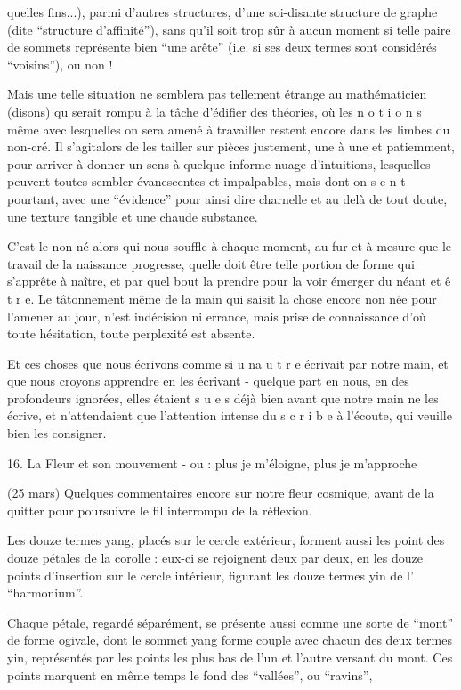 
\margin{\handwritten{\unsure{$\times$|*}}} quelles fins...), parmi d'autres structures, d'une soi-disante structure de graphe (dite ``structure d'affinité''), sans qu'il soit trop sûr à aucun moment si telle paire de sommets représente bien ``une arête'' (i.e. si ses deux termes sont considérés ``voisins''), ou non !

Mais une telle situation ne semblera pas tellement étrange au mathématicien \margin{\handwritten{*}}(disons) qu serait rompu à la tâche d'édifier des théories, où les n o t i o n s même avec lesquelles on sera amené à travailler restent encore dans les limbes du non-cré\leavevmode{}\handwritten{\'{\phantom{e}}}. Il s'agit\unsure{,}alors de les tailler sur pièces justement, une à une et patiemment, pour arriver à donner un sens à quelque informe nuage d'intuitions, lesquelles peuvent toutes sembler évanescentes et impalpables, mais dont on s e n t pourtant, avec une ``évidence'' pour ainsi dire charnelle et au delà de tout doute, une texture tangible et une chaude substance.

C'est le non-né alors qui nous souffle à chaque moment, au fur et à mesure que le travail de la naissance progresse, quelle doit être telle portion de forme qui s'apprête à naître, et par quel bout la prendre pour la voir émerger du néant et ê t r e. Le tâtonnement même de la main qui saisit la chose encore non née pour l'amener au jour, n'est indécision ni errance, mais prise de connaissance d'où toute hésitation, toute perplexité est absente.

Et ces choses que nous écrivons comme si u n\quad a u t r e écrivait par notre main, et que nous croyons apprendre en les écrivant - quelque part en nous, en des profondeurs ignorées, elles étaient s u e s déjà bien avant que notre main ne les écrive, et n'attendaient que l'attention intense du s c r i b e à l'écoute, qui veuille bien les consigner.

16. La Fleur et son mouvement - ou : plus je m'éloigne, plus je m'approche

(25 mars) Quelques commentaires encore sur notre fleur cosmique, avant de la quitter pour poursuivre le fil interrompu de la réflexion.

Les douze termes yang, placés sur le cercle extérieur, forment aussi les point des douze pétales de la corolle : eux-ci se rejoignent deux par deux, en les douze points d'insertion sur le cercle intérieur, figurant les douze termes yin de l' ``harmonium''.

Chaque pétale, regardé séparément, se présente aussi comme une sorte de ``mont'' de forme ogivale, dont le sommet yang forme couple avec chacun des deux termes yin, représentés par les points les plus bas\inserted{\handwritten{(*)}} de l'un et l'autre versant du mont. Ces points marquent en même temps le fond des ``vallées'', ou ``ravins'',

